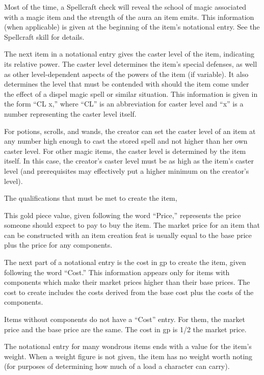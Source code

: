 \begin{itemize}
 Most of the time, a Spellcraft check will reveal the school of magic associated with a magic item and the strength of the aura an item emits. This information (when applicable) is given at the beginning of the item's notational entry. See the Spellcraft skill for details.

 The next item in a notational entry gives the caster level of the item, indicating its relative power. The caster level determines the item's special defenses, as well as other level-dependent aspects of the powers of the item (if variable). It also determines the level that must be contended with should the item come under the effect of a dispel magic spell or similar situation. This information is given in the form ``CL x,'' where ``CL'' is an abbreviation for caster level and ``x'' is a number representing the caster level itself.

For potions, scrolls, and wands, the creator can set the caster level of an item at any number high enough to cast the stored spell and not higher than her own caster level. For other magic items, the caster level is determined by the item itself. In this case, the creator's caster level must be as high as the item's caster level (and prerequisites may effectively put a higher minimum on the creator's level).

 The qualifications that must be met to create the item, %

 This gold piece value, given following the word ``Price,'' represents the price someone should expect to pay to buy the item. The market price for an item that can be constructed with an item creation feat is usually equal to the base price plus the price for any components.

 The next part of a notational entry is the cost in gp to create the item, given following the word ``Cost.'' This information appears only for items with components which make their market prices higher than their base prices. The cost to create includes the costs derived from the base cost plus the costs of the components.

Items without components do not have a ``Cost'' entry. For them, the market price and the base price are the same. The cost in gp is 1/2 the market price.

 The notational entry for many wondrous items ends with a value for the item's weight. When a weight figure is not given, the item has no weight worth noting (for purposes of determining how much of a load a character can carry).
\end{itemize}


